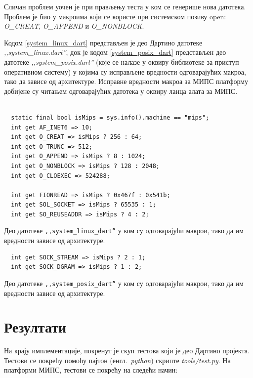 \documentclass[12pt,oneside]{memoir}
\begin{document}
Сличан проблем уочен је при прављењу теста у ком се генерише нова датотека. Проблем је био у макроима који се користе при системском позиву open: \textit{O\_CREAT}, \textit{O\_APPEND} и \textit{O\_NONBLOCK}.

Кодом \ref{system_linux_dart} представљен је део Дартино датотеке \textit{,,system\_linux.dart''}, док је кодом \ref{system_posix_dart} представљен део датотеке \textit{,,system\_posix.dart''} (које се налазе у оквиру библиотеке за приступ оперативном систему) у којима су исправљене вредности одговарајућих макроа, тако да зависе од архитектуре. Исправне вредности макроа за МИПС платформу добијене су читањем одговарајућих датотека у оквиру ланца алата за МИПС. \\

\begin{listing}
\begin{verbatim}

  static final bool isMips = sys.info().machine == "mips";
  int get AF_INET6 => 10;
  int get O_CREAT => isMips ? 256 : 64;
  int get O_TRUNC => 512;
  int get O_APPEND => isMips ? 8 : 1024;
  int get O_NONBLOCK => isMips ? 128 : 2048;
  int get O_CLOEXEC => 524288;

  int get FIONREAD => isMips ? 0x467f : 0x541b;
  int get SOL_SOCKET => isMips ? 65535 : 1;
  int get SO_REUSEADDR => isMips ? 4 : 2;
\end{verbatim}
\caption{Део датотеке \texttt{,,system\_linux\_dart''} у ком су одговарајући макрои, тако да им вредности зависе од архитектуре.}
\label{system_linux_dart}
\end{listing}

\begin{listing}
\begin{verbatim}
  int get SOCK_STREAM => isMips ? 2 : 1;
  int get SOCK_DGRAM => isMips ? 1 : 2;
\end{verbatim}
\caption{Део датотеке \texttt{,,system\_posix\_dart''} у ком су одговарајући макрои, тако да им вредности зависе од архитектуре.}
\label{system_posix_dart}
\end{listing}

\section{Резултати}
\label{rezultati}

На крају имплементације, покренут је скуп тестова који је део Дартино пројекта. Тестови се покрећу помоћу пајтон (енгл.~\textit{python}) скрипте \textit{tools/test.py}. На платформи МИПС, тестови се покрећу на следећи начин: 
\end{document}
